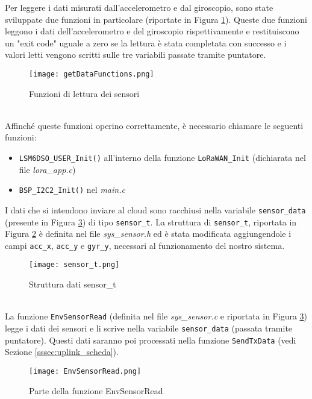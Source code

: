 Per leggere i dati misurati dall'accelerometro e dal giroscopio, sono state sviluppate due funzioni in particolare (riportate in Figura \ref{fig:lettura_sensori}). Queste due funzioni leggono i dati dell'accelerometro e del giroscopio rispettivamente e restituiscono un "exit code" uguale a zero se la lettura è stata completata con successo e i valori letti vengono scritti sulle tre variabili passate tramite puntatore.
\begin{figure}[h!]
  \centering
  \texttt{[image: getDataFunctions.png]}
  \caption{Funzioni di lettura dei sensori}
  \label{fig:lettura_sensori}
\end{figure}
\\Affinché queste funzioni operino correttamente, è necessario chiamare le seguenti funzioni:
\begin{itemize}
  \item \Verb|LSM6DSO_USER_Init()| all'interno della funzione \Verb|LoRaWAN_Init| (dichiarata nel file \textit{lora\_app.c})
  \item \Verb|BSP_I2C2_Init()| nel \textit{main.c}
\end{itemize}
I dati che si intendono inviare al cloud sono racchiusi nella variabile \Verb|sensor_data| (presente in Figura \ref{fig:envsensorread}) di tipo \Verb|sensor_t|. La struttura di \Verb|sensor_t|, riportata in Figura \ref{fig:sensor_t} è definita nel file \textit{sys\_sensor.h} ed è stata modificata aggiungendole i campi \Verb|acc_x|, \Verb|acc_y| e \Verb|gyr_y|, necessari al funzionamento del nostro sistema.
\begin{figure}[h!]
  \centering
  \texttt{[image: sensor\_t.png]}
  \caption{Struttura dati sensor\_t}
  \label{fig:sensor_t}
\end{figure}
\\La funzione \Verb|EnvSensorRead| (definita nel file \textit{sys\_sensor.c} e riportata in Figura \ref{fig:envsensorread}) legge i dati dei sensori e li scrive nella variabile \Verb|sensor_data| (passata tramite puntatore). Questi dati saranno poi processati nella funzione \Verb|SendTxData| (vedi Sezione \ref{sssec:uplink_scheda}).
\begin{figure}[h!]
  \centering
  \texttt{[image: EnvSensorRead.png]}
  \caption{Parte della funzione EnvSensorRead}
  \label{fig:envsensorread}
\end{figure}

